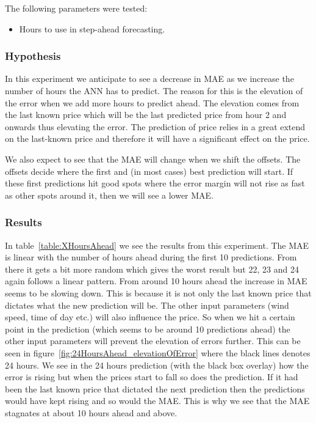 The following parameters were tested:

\begin{itemize}
	\item Hours to use in step-ahead forecasting.
\end{itemize}

\subsubsection{Hypothesis}
In this experiment we anticipate to see a decrease in MAE as we increase the number of hours the ANN has to predict. The reason for this is the elevation of the error when we add more hours to predict ahead. The elevation comes from the last known price which will be the last predicted price from hour 2 and onwards thus elevating the error. The prediction of price relies in a great extend on the last-known price and therefore it will have a significant effect on the price.

We also expect to see that the MAE will change when we shift the offsets. The offsets decide where the first and (in most cases) best prediction will start. If these first predictions hit good spots where the error margin will not rise as fast as other spots around it, then we will see a lower MAE.

\subsubsection{Results}
In table~\ref{table:XHoursAhead} we see the results from this experiment. The MAE is linear with the number of hours ahead during the first 10 predictions. From there it gets a bit more random which gives the worst result but 22, 23 and 24 again follows a linear pattern. From around 10 hours ahead the increase in MAE seems to be slowing down. This is because it is not only the last known price that dictates what the new prediction will be. The other input parameters (wind speed, time of day etc.) will also influence the price. So when we hit a certain point in the prediction (which seems to be around 10 predictions ahead) the other input parameters will prevent the elevation of errors further. This can be seen in figure~\ref{fig:24HoursAhead_elevationOfError} where the black lines denotes 24 hours. We see in the 24 hours prediction (with the black box overlay) how the error is rising but when the prices start to fall so does the prediction. If it had been the last known price that dictated the next prediction then the predictions would have kept rising and so would the MAE. This is why we see that the MAE stagnates at about 10 hours ahead and above.

